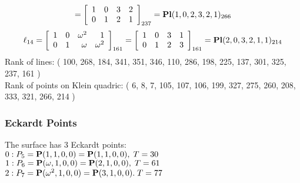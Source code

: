 \documentclass{article}
\newcommand{\bP}{{\bf P}}
\begin{document}
{$$=
\left[
\begin{array}{*{4}c}
1  & 0  & 3  & 2\\
0  & 1  & 2  & 1\\
\end{array}
\right]_{237}
={\rm\bf Pl}(1,0,2,3,2,1 )_{266}$$
$$
\ell_{14} = 
\left[
\begin{array}{*{4}{r}}
1 & 0 & \omega^{2} & 1\\
0 & 1 & \omega  & \omega^{2}\\
\end{array}
\right]
_{161}
=
\left[
\begin{array}{*{4}c}
1  & 0  & 3  & 1\\
0  & 1  & 2  & 3\\
\end{array}
\right]_{161}
={\rm\bf Pl}(2,0,3,2,1,1 )_{214}$$
Rank of lines: ( 100, 268, 184, 341, 351, 346, 110, 286, 198, 225, 137, 301, 325, 237, 161 )\\
Rank of points on Klein quadric: ( 6, 8, 7, 105, 107, 106, 199, 327, 275, 260, 208, 333, 321, 266, 214 )\\
\subsubsection*{Eckardt Points}
The surface has 3 Eckardt points:\\
$0 : P_{5}=\bP(1, 1, 0, 0) = \bP(1, 1, 0, 0),\; T= 30$\\
$1 : P_{6}=\bP(\omega , 1, 0, 0) = \bP(2, 1, 0, 0),\; T= 61$\\
$2 : P_{7}=\bP(\omega^{2}, 1, 0, 0) = \bP(3, 1, 0, 0).\; T= 77$\\
}
\end{document}
